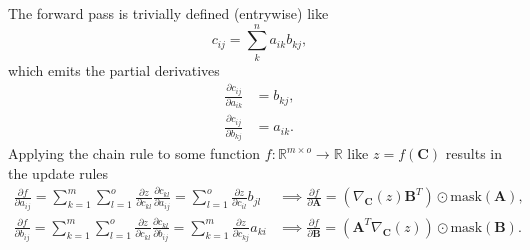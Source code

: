 \documentclass{article}
\newcommand{\mat}[1]{\bm{{#1}}}
\newcommand{\mask}[1]{\text{mask}\left( {#1} \right)}
\newcommand{\gradfn}[2]{\nabla_{{#1}}\left({#2}\right)}
\theoremstyle{definition}
\begin{document}
The forward pass is trivially defined (entrywise) like
\begin{equation}
  c_{ij} = \sum_k^n a_{ik} b_{kj},
\end{equation}
which emits the partial derivatives
\begin{align}
  \frac{\partial c_{ij}}{\partial a_{ik}} &= b_{kj}, \\
  \frac{\partial c_{ij}}{\partial b_{kj}} &= a_{ik}.
\end{align}
Applying the chain rule to some function $f : \mathbb{R}^{m \times o} \to \mathbb{R}$ like $z=f\left(\mat{C}\right)$ results in the update rules
\begin{align}
  \frac{\partial f}{\partial a_{ij}} = \sum_{k=1}^m \sum_{l=1}^o \frac{\partial z}{\partial c_{kl}} \frac{\partial c_{kl}}{\partial a_{ij}} = \sum_{l=1}^o \frac{\partial z}{\partial c_{il}} b_{jl} &\implies \frac{\partial f}{\partial \mat{A}} = \left(\gradfn{\mat{C}}{z} \mat{B}^T\right) \odot \mask{\mat{A}}, \\
  \frac{\partial f}{\partial b_{ij}} = \sum_{k=1}^m \sum_{l=1}^o \frac{\partial z}{\partial c_{kl}} \frac{\partial c_{kl}}{\partial b_{ij}} = \sum_{k=1}^m \frac{\partial z}{\partial c_{kj}} a_{ki} &\implies \frac{\partial f}{\partial \mat{B}} = \left(\mat{A}^T \gradfn{\mat{C}}{z}\right) \odot \mask{\mat{B}}.
\end{align}



\end{document}
